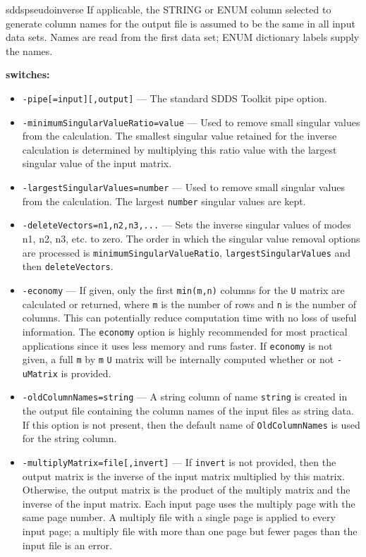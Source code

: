 \begin{sddsprog}{sddspseudoinverse}
    If applicable, the STRING or ENUM column selected to generate column names for the output file is assumed to be the same in all input data sets. Names are read from the first data set; ENUM dictionary labels supply the names.

  \item \textbf{switches:}
    \begin{itemize}
      \item \verb|-pipe[=input][,output]| --- The standard SDDS Toolkit pipe option.
      \item \verb|-minimumSingularValueRatio=value| --- Used to remove small singular values from the calculation. The smallest singular value retained for the inverse calculation is determined by multiplying this ratio value with the largest singular value of the input matrix.
      \item \verb|-largestSingularValues=number| --- Used to remove small singular values from the calculation. The largest \verb|number| singular values are kept.
      \item \verb|-deleteVectors=n1,n2,n3,...| --- Sets the inverse singular values of modes n1, n2, n3, etc. to zero. The order in which the singular value removal options are processed is \verb|minimumSingularValueRatio|, \verb|largestSingularValues| and then \verb|deleteVectors|.
      \item \verb|-economy| --- If given, only the first \verb|min(m,n)| columns for the \verb|U| matrix are calculated or returned, where \verb|m| is the number of rows and \verb|n| is the number of columns. This can potentially reduce computation time with no loss of useful information. The \verb|economy| option is highly recommended for most practical applications since it uses less memory and runs faster. If \verb|economy| is not given, a full \verb|m| by \verb|m| \verb|U| matrix will be internally computed whether or not \verb|-uMatrix| is provided.
      \item \verb|-oldColumnNames=string| --- A string column of name {\tt string} is created in the output file containing the column names of the input files as string data. If this option is not present, then the default name of \verb|OldColumnNames| is used for the string column.
      \item \verb|-multiplyMatrix=file[,invert]| --- If \verb|invert| is not provided, then the output matrix is the inverse of the input matrix multiplied by this matrix. Otherwise, the output matrix is the product of the multiply matrix and the inverse of the input matrix. Each input page uses the multiply page with the same page number. A multiply file with a single page is applied to every input page; a multiply file with more than one page but fewer pages than the input file is an error.

\end{itemize}
\end{sddsprog}
